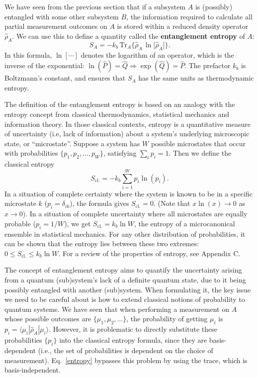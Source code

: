 \documentclass[pra,12pt]{revtex4}
\begin{document}
We have seen from the previous section that if a subsystem $A$ is
(possibly) entangled with some other subsystem $B$, the information
required to calculate all partial measurement outcomes on $A$ is
stored within a reduced density operator $\hat{\rho}_A$.  We can use
this to define a quantity called the \textbf{entanglement entropy} of
$A$:
\begin{equation}
  S_{A} = - k_b \, \mathrm{Tr}_A \Big\{ \hat{\rho}_A\, \ln\!\big[\hat{\rho}_A\big]\Big\}.
  \label{entropy}
\end{equation}
In this formula, $\ln[\cdots]$ denotes the logarithm of an operator,
which is the inverse of the exponential: $\ln(\hat{P}) = \hat{Q}
\Rightarrow \exp(\hat{Q}) = \hat{P}$.  The prefactor $k_b$ is
Boltzmann's constant, and ensures that $S_A$ has the same units as
thermodynamic entropy.

The definition of the entanglement entropy is based on an analogy with
the entropy concept from classical thermodynamics, statistical
mechanics and information theory.  In those classical contexts,
entropy is a quantitative measure of uncertainty (i.e, lack of
information) about a system's underlying microscopic state, or
``microstate''.  Suppose a system has $W$ possible microstates that
occur with probabilities $\{p_1, p_2, \dots, p_W\}$, satisfying
$\sum_i p_i = 1$.  Then we define the classical entropy
\begin{equation}
  S_{\mathrm{cl.}} = - k_b \sum_{i=1}^W p_i \ln(p_i).
\end{equation}
In a situation of complete certainty where the system is known to be
in a specific microstate $k$ ($p_i = \delta_{ik}$), the formula gives
$S_{\mathrm{cl.}} = 0$.  (Note that $x \ln(x)\rightarrow 0$ as
$x\rightarrow 0$).  In a situation of complete uncertainty where all
microstates are equally probable ($p_i = 1/W$), we get
$S_{\mathrm{cl.}} = k_b \ln W$, the entropy of a microcanonical
ensemble in statistical mechanics.  For any other distribution of
probabilities, it can be shown that the entropy lies between these two
extremes: $0 \le S_{\mathrm{cl.}}  \le k_b\ln W$.  For a review of the
properties of entropy, see Appendix C.

The concept of entanglement entropy aims to quantify the uncertainty
arising from a quantum (sub)system's lack of a definite quantum state,
due to it being possibly entangled with another (sub)system.  When
formulating it, the key issue we need to be careful about is how to
extend classical notions of probability to quantum systems.  We have
seen that when performing a measurement on $A$ whose possible outcomes
are $\{\mu_1, \mu_2, \dots\}$, the probability of getting $\mu_i$ is
$p_i = \langle \mu_i | \hat{\rho}_A|\mu_i\rangle$.  However, it is
problematic to directly substitute these probabilities $\{p_i\}$ into
the classical entropy formula, since they are basis-dependent (i.e.,
the set of probabilities is dependent on the choice of measurement).
Eq.~\eqref{entropy} bypasses this problem by using the trace, which is
basis-independent.
\end{document}
